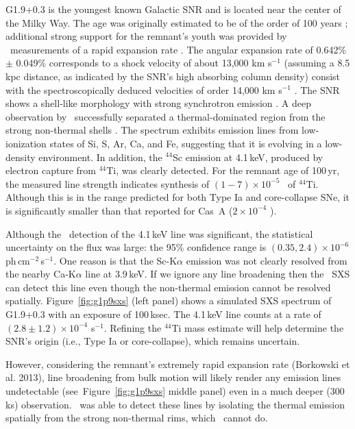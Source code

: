 \documentclass[11pt,a4paper]{article}
\begin{document}
{G1.9+0.3 is the youngest known Galactic SNR and is located near the
center of the Milky Way. The age was originally estimated to be of the
order of 100 years \citep{reynolds+08}; additional strong support for
the remnant's youth was provided by \chandra\ measurements of a rapid
expansion rate \citep{carlton+11}.  The angular expansion rate of
0.642\% $\pm$ 0.049\% corresponds to a shock velocity of about 13,000
km s$^{-1}$ (assuming a 8.5 kpc distance, as indicated by the SNR's
high absorbing column density) consist with the spectroscopically
deduced velocities of order 14,000 km s$^{-1}$ \citep{borkowski+10}.
The SNR shows a shell-like morphology with strong synchrotron emission
\citep{reynolds+09}.  A deep observation by \chandra\ successfully
separated a thermal-dominated region from the strong non-thermal
shells \citep{borkowski+10}. The spectrum exhibits emission lines from
low-ionization states of Si, S, Ar, Ca, and Fe, suggesting that it is
evolving in a low-density environment. In addition, the $^{44}$Sc
emission at 4.1\,keV, produced by electron capture from $^{44}$Ti, was
clearly detected. For the remnant age of 100\,yr, the measured line
strength indicates synthesis of $(1-7) \times 10^{-5}$ \msun\ of
$^{44}$Ti. Although this is in the range predicted for both Type Ia
and core-collapse SNe, it is significantly smaller than that reported
for Cas~A ($2 \times 10^{-4}$ \msun).

Although the \chandra\ detection of the 4.1\,keV line was significant,
the statistical uncertainty on the flux was large: the 95\% confidence
range is $(0.35,2.4) \times 10^{-6}$\,ph\,cm$^{-2}$\,s$^{-1}$. One
reason is that the Sc-K$\alpha$ emission was not clearly resolved from
the nearby Ca-K$\alpha$ line at 3.9\,keV. If we ignore any line
broadening then the \ah\ SXS can detect this line even though the
non-thermal emission cannot be resolved
spatially. Figure~\ref{fig:g1p9sxs} (left panel) shows a simulated SXS
spectrum of G1.9+0.3 with an exposure of 100\,ksec. The 4.1\,keV line
counts at a rate of $(2.8 \pm 1.2) \times 10^{-4}$ s$^{-1}$. Refining
the $^{44}$Ti mass estimate will help determine the SNR's origin
(i.e., Type Ia or core-collapse), which remains uncertain.

However, considering the remnant's extremely rapid expansion rate (Borkowski et al. 2013),
line broadening from bulk motion will likely render any emission lines
undetectable (see~Figure~\ref{fig:g1p9sxs} middle panel) even in a
much deeper (300 ks) observation.  \chandra\ was able to detect these
lines by isolating the thermal emission spatially from the strong
non-thermal rims, which \ah\ cannot do.

}
\end{document}
